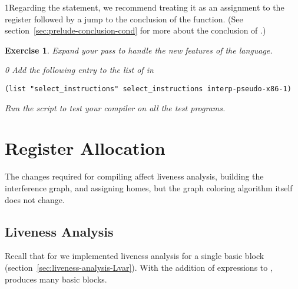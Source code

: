 \documentclass[7x10]{TimesAPriori_MIT}%
\def\racketEd{0}
\def\pythonEd{1}
\def\edition{1}
\newcommand{\pythonColor}[0]{}
\newcommand{\python}[1]{{\if\edition\pythonEd\pythonColor #1\fi}}
\newtheorem{exercise}[theorem]{Exercise}
\numberwithin{theorem}{chapter}
\numberwithin{definition}{chapter}
\numberwithin{equation}{chapter}
\begin{document}
\python{Regarding the  statement, we recommend treating it
  as an assignment to the \key{rax} register followed by a jump to the
  conclusion of the \code{main} function. (See section~\ref{sec:prelude-conclusion-cond} for more about the conclusion of \code{main}.)}

\begin{exercise}\normalfont\normalsize
Expand your  pass to handle the new
features of the \LangCIf{} language.
%
{\if\edition\racketEd
Add the following entry to the list of  in
\begin{lstlisting}
(list "select_instructions" select_instructions interp-pseudo-x86-1)
\end{lstlisting}
\fi}
%
Run the script to test your compiler on all the test programs.
\end{exercise}

\section{Register Allocation}
\label{sec:register-allocation-Lif}

The changes required for compiling \LangIf{} affect liveness analysis,
building the interference graph, and assigning homes, but the graph
coloring algorithm itself does not change.

\subsection{Liveness Analysis}
\label{sec:liveness-analysis-Lif}

Recall that for \LangVar{} we implemented liveness analysis for a
single basic block (section~\ref{sec:liveness-analysis-Lvar}).  With
the addition of  expressions to \LangIf{},
 produces many basic blocks.

\end{document}
